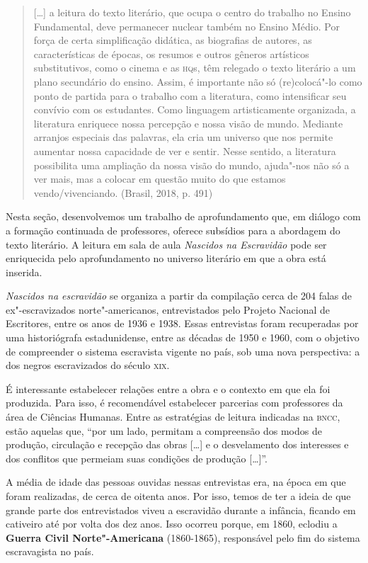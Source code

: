 \documentclass[12pt]{extarticle}
\begin{document}
\begin{quote}
{[}\ldots{}{]} a leitura do texto literário, que ocupa o centro do trabalho
no Ensino Fundamental, deve permanecer nuclear também no Ensino Médio.
Por força de certa simplificação didática, as biografias de autores, as
características de épocas, os resumos e outros gêneros artísticos
substitutivos, como o cinema e as \textsc{hq}s, têm relegado o texto literário a
um plano secundário do ensino. Assim, é importante não só (re)colocá"-lo
como ponto de partida para o trabalho com a literatura, como
intensificar seu convívio com os estudantes. Como linguagem
artisticamente organizada, a literatura enriquece nossa percepção e
nossa visão de mundo. Mediante arranjos especiais das palavras, ela cria
um universo que nos permite aumentar nossa capacidade de ver e sentir.
Nesse sentido, a literatura possibilita uma ampliação da nossa visão do
mundo, ajuda"-nos não só a ver mais, mas a colocar em questão muito do
que estamos vendo/vivenciando. (Brasil, 2018, p. 491)
\end{quote}

Nesta seção, desenvolvemos um trabalho de aprofundamento que, em diálogo
com a formação continuada de professores, oferece subsídios para a
abordagem do texto literário. A leitura em sala de aula \emph{Nascidos
na Escravidão} pode ser enriquecida pelo aprofundamento no universo
literário em que a obra está inserida.

\emph{Nascidos na escravidão} se organiza a partir da compilação cerca
de 204 falas de ex"-escravizados norte"-americanos, entrevistados pelo
Projeto Nacional de Escritores, entre os anos de 1936 e 1938. Essas
entrevistas foram recuperadas por uma historiógrafa estadunidense, entre
as décadas de 1950 e 1960, com o objetivo de compreender o sistema
escravista vigente no país, sob uma nova perspectiva: a dos negros
escravizados do século \textsc{xix}.

É interessante estabelecer relações entre a obra e o contexto em que ela
foi produzida. Para isso, é recomendável estabelecer parcerias com
professores da área de Ciências Humanas. Entre as estratégias de leitura
indicadas na \textsc{bncc}, estão aquelas que, ``por um lado, permitam a
compreensão dos modos de produção, circulação e recepção das obras
{[}\ldots{}{]} e o desvelamento dos interesses e dos conflitos que permeiam
suas condições de produção {[}\ldots{}{]}''.

A média de idade das pessoas ouvidas nessas entrevistas era, na época em
que foram realizadas, de cerca de oitenta anos. Por isso, temos de ter a
ideia de que grande parte dos entrevistados viveu a escravidão durante a
infância, ficando em cativeiro até por volta dos dez anos. Isso ocorreu
porque, em 1860, eclodiu a \textbf{Guerra Civil Norte"-Americana}
(1860-1865), responsável pelo fim do sistema escravagista no país.
\end{document}
